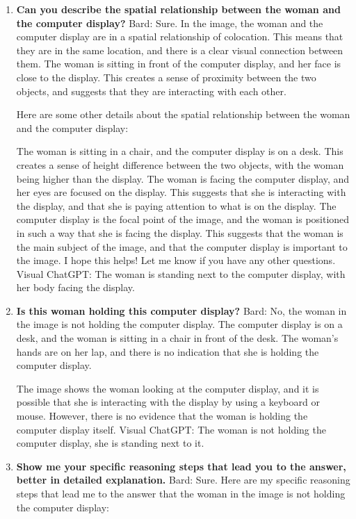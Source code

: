     \begin{enumerate}
        \item \textbf{Can you describe the spatial relationship between the woman and the computer display?}
        \subitem Bard: 
        Sure. In the image, the woman and the computer display are in a spatial relationship of colocation. This means that they are in the same location, and there is a clear visual connection between them. The woman is sitting in front of the computer display, and her face is close to the display. This creates a sense of proximity between the two objects, and suggests that they are interacting with each other.

        Here are some other details about the spatial relationship between the woman and the computer display:

        The woman is sitting in a chair, and the computer display is on a desk. This creates a sense of height difference between the two objects, with the woman being higher than the display.
        The woman is facing the computer display, and her eyes are focused on the display. This suggests that she is interacting with the display, and that she is paying attention to what is on the display.
        The computer display is the focal point of the image, and the woman is positioned in such a way that she is facing the display. This suggests that the woman is the main subject of the image, and that the computer display is important to the image.
        I hope this helps! Let me know if you have any other questions.
        \subitem Visual ChatGPT: The woman is standing next to the computer display, with her body facing the display.
        \item \textbf{Is this woman holding this computer display?}
        \subitem Bard: 
        No, the woman in the image is not holding the computer display. The computer display is on a desk, and the woman is sitting in a chair in front of the desk. The woman's hands are on her lap, and there is no indication that she is holding the computer display.
        
        The image shows the woman looking at the computer display, and it is possible that she is interacting with the display by using a keyboard or mouse. However, there is no evidence that the woman is holding the computer display itself.  
        \subitem Visual ChatGPT: The woman is not holding the computer display, she is standing next to it.      
        \item \textbf{Show me your specific reasoning steps that lead you to the answer, better in detailed explanation.}
        \subitem Bard: Sure. Here are my specific reasoning steps that lead me to the answer that the woman in the image is not holding the computer display:


\end{enumerate}
